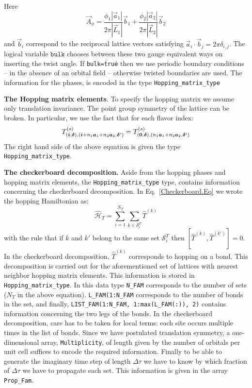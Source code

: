 Here 
\begin{equation}
	\vec{A}_{\phi} =\frac{  \phi_1  |\vec{a}_1|} { 2 \pi |\vec{L}_1| } \vec{b}_1 +  \frac{  \phi_2  |\vec{a}_2|}{2 \pi  |\vec{L}_2| } \vec{b}_2
\end{equation}
and $\vec{b}_i$  correspond to the reciprocal lattice vectors satisfying  $ \vec{a}_i  \cdot  \vec{b}_j  = 2 \pi \delta_{i,j} $.   The logical variable $\texttt{bulk} $ chooses between these two  gauge equivalent ways  on inserting the twist angle. If \texttt{bulk=\.true\.}    then  we use periodic boundary conditions  --  in the absence of an orbital field -- otherwise  twisted boundaries are used.  
The information for the phases,    is encoded in  the type \texttt{Hopping\_matrix\_type} 

\noindent
\textbf{The  Hopping matrix elements}. 
To specify the hopping matrix  we  assume  only translation invariance.  The point group symmetry of the lattice can be broken.   In particular, we use the fact that for  each flavor index: 
\begin{equation} 
	 T_{(\boldsymbol{i},\boldsymbol{\delta}), (\boldsymbol{i} +  n_1\boldsymbol{a}_1  + n_2 \boldsymbol{a}_2,\boldsymbol{\delta}')}^{(s)}   =   T^{(s)}_{(\boldsymbol{0},\boldsymbol{\delta}),  (n_1\boldsymbol{a}_1  + n_2 \boldsymbol{a}_2,\boldsymbol{\delta}') }
\label{Hop.eq}	 
\end{equation}
The right  hand side of the above equation is given  the type  \texttt{Hopping\_matrix\_type}.


\noindent
\textbf{The checkerboard decomposition.}   Aside from the hopping phases and hopping matrix elements, the \texttt{Hopping\_matrix\_type} type, contains information  concerning the checkerboard   decomposition.  In Eq.~\ref{Checkerboard.Eq} we wrote the hopping Hamiltonian as:
\begin{equation}
	\hat{\mathcal{H}}_{T}     = \sum_{i=1}^{N_T} \sum_{k \in \mathcal{S}^{T}_i} \hat{T}^{(k)}  
\end{equation}
with the rule that  if $k$ and $k'$  belong to the same set $\mathcal{S}^{T}_i $ then   $ \left[ \hat{T}^{(k)} , \hat{T}^{(k')} \right] = 0 $.  In the checkerboard decomposition, $\hat{T}^{(k)}$   corresponds to  hopping on a bond.   This decomposition is carried out for the aforementioned set of lattices with nearest neighbor  hopping matrix elements.  This information is stored in  \texttt{Hopping\_matrix\_type}. In this data type  \texttt{N\_FAM}  corresponds to the number of sets  ($N_T$ in the above equation). \texttt{L\_FAM(1:N\_FAM}   corresponds to the number of bonds in the set,  and finally, 
 \texttt{LIST\_FAM(1:N\_FAM, 1:max(L\_FAM(:)), 2)}    contains  information concerning the two legs of the bonds.    In the checkerboard decomposition, care has to be taken for local terms: each site  occurs multiple times in the list of bonds.    Since we have postulated translation symmetry,    a one-dimensional array, \texttt{Multiplicity},  of length  given by  the number of orbitals per unit cell suffices to  encode the required information.  
 Finally to be able to generate  the imaginary time step of length $\Delta \tau$  we  have to know   by which fraction of  $\Delta \tau$   we have to propagate each set.  This information is given in  the array  \texttt{Prop\_Fam}.  
 




